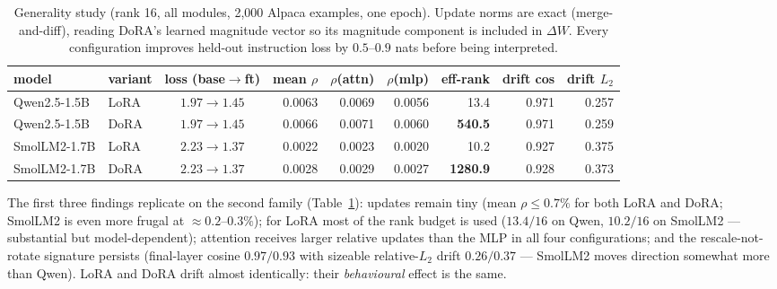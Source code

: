 \documentclass[11pt,a4paper]{article}
\begin{document}
\begin{table}[h]\centering
\small
\begin{tabular}{llcrrrrrr}
\toprule
model & variant & loss (base$\to$ft) & mean $\rho$ & $\rho$(attn) & $\rho$(mlp) & eff-rank & drift cos & drift $L_2$ \\
\midrule
Qwen2.5-1.5B & LoRA & $1.97\to1.45$ & 0.0063 & 0.0069 & 0.0056 & 13.4 & 0.971 & 0.257 \\
Qwen2.5-1.5B & DoRA & $1.97\to1.45$ & 0.0066 & 0.0071 & 0.0060 & \textbf{540.5} & 0.971 & 0.259 \\
SmolLM2-1.7B & LoRA & $2.23\to1.37$ & 0.0022 & 0.0023 & 0.0020 & 10.2 & 0.927 & 0.375 \\
SmolLM2-1.7B & DoRA & $2.23\to1.37$ & 0.0028 & 0.0029 & 0.0027 & \textbf{1280.9} & 0.928 & 0.373 \\
\bottomrule
\end{tabular}
\caption{Generality study (rank 16, all modules, 2{,}000 Alpaca examples, one
epoch). Update norms are exact (merge-and-diff), reading DoRA's learned magnitude
vector so its magnitude component is included in $\Delta W$. Every configuration
improves held-out instruction loss by $0.5$--$0.9$ nats before being interpreted.}
\label{tab:gen}
\end{table}

The first three findings replicate on the second family
(Table~\ref{tab:gen}): updates remain tiny (mean $\rho\le 0.7\%$ for both LoRA
and DoRA; SmolLM2 is even more frugal at $\approx 0.2$--$0.3\%$); for LoRA most
of the rank budget is used ($13.4/16$ on Qwen, $10.2/16$ on SmolLM2 ---
substantial but model-dependent); attention receives larger relative updates
than the MLP in all four configurations; and the rescale-not-rotate signature
persists (final-layer cosine $0.97/0.93$ with sizeable relative-$L_2$ drift
$0.26/0.37$ --- SmolLM2 moves direction somewhat more than Qwen). LoRA and DoRA
drift almost identically: their \emph{behavioural} effect is the same.
\end{document}
